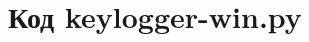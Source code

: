 \documentclass[bachelor, och, coursework]{SCWorks}
\begin{document}
  \appendix

    \section{Код keylogger-win.py}
    \inputminted[fontsize=\footnotesize]{Python}{code/keylogger-win.py}


\end{document}
